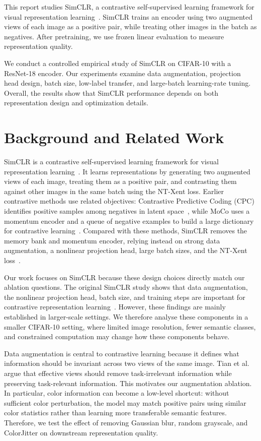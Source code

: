 \documentclass[10pt]{article}
\begin{document}
This report studies SimCLR, a contrastive self-supervised learning framework for visual representation learning~\cite{simclr}. SimCLR trains an encoder using two augmented views of each image as a positive pair, while treating other images in the batch as negatives. After pretraining, we use frozen linear evaluation to measure representation quality.

We conduct a controlled empirical study of SimCLR on CIFAR-10 with a ResNet-18 encoder. Our experiments examine data augmentation, projection head design, batch size, low-label transfer, and large-batch learning-rate tuning. Overall, the results show that SimCLR performance depends on both representation design and optimization details.

\section{Background and Related Work}

SimCLR is a contrastive self-supervised learning framework for visual representation learning~\cite{simclr}. It learns representations by generating two augmented views of each image, treating them as a positive pair, and contrasting them against other images in the same batch using the NT-Xent loss. Earlier contrastive methods use related objectives: Contrastive Predictive Coding (CPC) identifies positive samples among negatives in latent space~\cite{cpc}, while MoCo uses a momentum encoder and a queue of negative examples to build a large dictionary for contrastive learning~\cite{moco}. Compared with these methods, SimCLR removes the memory bank and momentum encoder, relying instead on strong data augmentation, a nonlinear projection head, large batch sizes, and the NT-Xent loss~\cite{simclr}.

Our work focuses on SimCLR because these design choices directly match our ablation questions. The original SimCLR study shows that data augmentation, the nonlinear projection head, batch size, and training steps are important for contrastive representation learning~\cite{simclr}. However, these findings are mainly established in larger-scale settings. We therefore analyse these components in a smaller CIFAR-10 setting, where limited image resolution, fewer semantic classes, and constrained computation may change how these components behave.

Data augmentation is central to contrastive learning because it defines what information should be invariant across two views of the same image. Tian et al.~\cite{goodviews} argue that effective views should remove task-irrelevant information while preserving task-relevant information. This motivates our augmentation ablation. In particular, color information can become a low-level shortcut: without sufficient color perturbation, the model may match positive pairs using similar color statistics rather than learning more transferable semantic features. Therefore, we test the effect of removing Gaussian blur, random grayscale, and ColorJitter on downstream representation quality.
\end{document}
